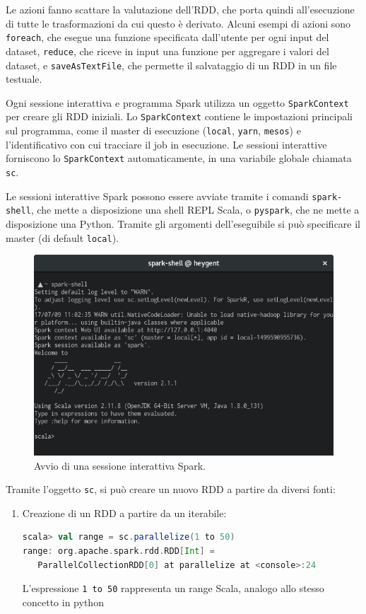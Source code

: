 \documentclass[italian,a4paper, twoside, 12pt]{report}
\begin{document}
Le azioni fanno scattare la valutazione dell'RDD, che porta quindi
all'esecuzione di tutte le trasformazioni da cui questo è derivato.
Alcuni esempi di azioni sono \lstinline!foreach!, che esegue una
funzione specificata dall'utente per ogni input del dataset,
\lstinline!reduce!, che riceve in input una funzione per aggregare i
valori del dataset, e \lstinline!saveAsTextFile!, che permette il
salvataggio di un RDD in un file testuale.

Ogni sessione interattiva e programma Spark utilizza un oggetto
\lstinline!SparkContext! per creare gli RDD iniziali. Lo
\lstinline!SparkContext! contiene le impostazioni principali sul
programma, come il master di esecuzione (\lstinline!local!,
\lstinline!yarn!, \lstinline!mesos!) e l'identificativo con cui
tracciare il job in esecuzione. Le sessioni interattive forniscono lo
\lstinline!SparkContext! automaticamente, in una variabile globale
chiamata \lstinline!sc!.

Le sessioni interattive Spark possono essere avviate tramite i comandi
\lstinline!spark-shell!, che mette a disposizione una shell REPL Scala,
o \lstinline!pyspark!, che ne mette a disposizione una Python. Tramite
gli argomenti dell'eseguibile si può specificare il master (di default
\lstinline!local!).

\begin{figure}
\centering
\includegraphics{img/spark-shell.png}
\caption{Avvio di una sessione interattiva Spark.}
\end{figure}

Tramite l'oggetto \lstinline!sc!, si può creare un nuovo RDD a partire
da diversi fonti:

\begin{enumerate}
\def\labelenumi{(\arabic{enumi})}
\setcounter{enumi}{2}
\item
  Creazione di un RDD a partire da un iterabile:

\begin{lstlisting}[language=Scala]
scala> val range = sc.parallelize(1 to 50)
range: org.apache.spark.rdd.RDD[Int] = 
   ParallelCollectionRDD[0] at parallelize at <console>:24
\end{lstlisting}

  L'espressione \lstinline!1 to 50! rappresenta un range Scala, analogo
  allo stesso concetto in python
\end{enumerate}
\end{document}
